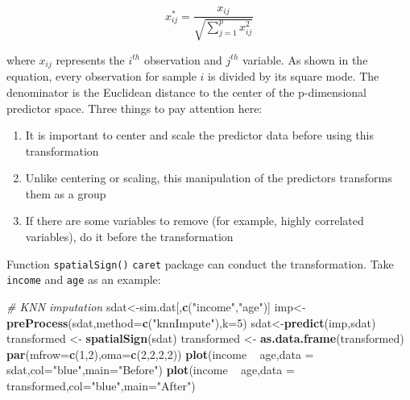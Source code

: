 \documentclass[]{book}
\newenvironment{Shaded}{\begin{snugshade}}{\end{snugshade}}
\newcommand{\KeywordTok}[1]{\textcolor[rgb]{0.13,0.29,0.53}{\textbf{{#1}}}}
\newcommand{\DataTypeTok}[1]{\textcolor[rgb]{0.13,0.29,0.53}{{#1}}}
\newcommand{\DecValTok}[1]{\textcolor[rgb]{0.00,0.00,0.81}{{#1}}}
\newcommand{\StringTok}[1]{\textcolor[rgb]{0.31,0.60,0.02}{{#1}}}
\newcommand{\CommentTok}[1]{\textcolor[rgb]{0.56,0.35,0.01}{\textit{{#1}}}}
\newcommand{\NormalTok}[1]{{#1}}
\providecommand{\tightlist}{%
  \setlength{\itemsep}{0pt}\setlength{\parskip}{0pt}}
\theoremstyle{definition}
\theoremstyle{definition}
\theoremstyle{remark}
\begin{document}
\[x_{ij}^{*}=\frac{x_{ij}}{\sqrt{\sum_{j=1}^{p}x_{ij}^{2}}}\]

where \(x_{ij}\) represents the \(i^{th}\) observation and \(j^{th}\)
variable. As shown in the equation, every observation for sample \(i\)
is divided by its square mode. The denominator is the Euclidean distance
to the center of the p-dimensional predictor space. Three things to pay
attention here:

\begin{enumerate}
\def\labelenumi{\arabic{enumi}.}
\tightlist
\item
  It is important to center and scale the predictor data before using
  this transformation
\item
  Unlike centering or scaling, this manipulation of the predictors
  transforms them as a group
\item
  If there are some variables to remove (for example, highly correlated
  variables), do it before the transformation
\end{enumerate}

Function \texttt{spatialSign()} \texttt{caret} package can conduct the
transformation. Take \texttt{income} and \texttt{age} as an example:

\begin{Shaded}
\begin{Highlighting}[]
\CommentTok{# KNN imputation}
\NormalTok{sdat<-sim.dat[,}\KeywordTok{c}\NormalTok{(}\StringTok{"income"}\NormalTok{,}\StringTok{"age"}\NormalTok{)]}
\NormalTok{imp<-}\KeywordTok{preProcess}\NormalTok{(sdat,}\DataTypeTok{method=}\KeywordTok{c}\NormalTok{(}\StringTok{"knnImpute"}\NormalTok{),}\DataTypeTok{k=}\DecValTok{5}\NormalTok{)}
\NormalTok{sdat<-}\KeywordTok{predict}\NormalTok{(imp,sdat)}
\NormalTok{transformed <-}\StringTok{ }\KeywordTok{spatialSign}\NormalTok{(sdat)}
\NormalTok{transformed <-}\StringTok{ }\KeywordTok{as.data.frame}\NormalTok{(transformed)}
\KeywordTok{par}\NormalTok{(}\DataTypeTok{mfrow=}\KeywordTok{c}\NormalTok{(}\DecValTok{1}\NormalTok{,}\DecValTok{2}\NormalTok{),}\DataTypeTok{oma=}\KeywordTok{c}\NormalTok{(}\DecValTok{2}\NormalTok{,}\DecValTok{2}\NormalTok{,}\DecValTok{2}\NormalTok{,}\DecValTok{2}\NormalTok{))}
\KeywordTok{plot}\NormalTok{(income ~}\StringTok{ }\NormalTok{age,}\DataTypeTok{data =} \NormalTok{sdat,}\DataTypeTok{col=}\StringTok{"blue"}\NormalTok{,}\DataTypeTok{main=}\StringTok{"Before"}\NormalTok{)}
\KeywordTok{plot}\NormalTok{(income ~}\StringTok{ }\NormalTok{age,}\DataTypeTok{data =} \NormalTok{transformed,}\DataTypeTok{col=}\StringTok{"blue"}\NormalTok{,}\DataTypeTok{main=}\StringTok{"After"}\NormalTok{)}
\end{Highlighting}
\end{Shaded}
\end{document}
